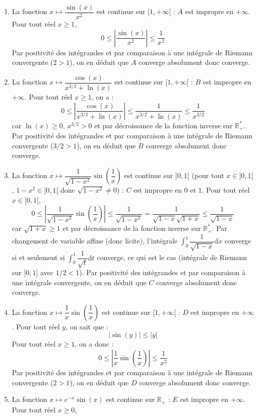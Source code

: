 \documentclass[a4paper,twoside,french,10pt]{VcCours}
\newcommand{\dx}{\text{d}x}
\newcommand{\dt}{\text{d}t}
\begin{document}
\begin{enumerate}
\item La fonction $x \mapsto  \dfrac{\sin(x)}{x^2}$ est continue sur $[1, + \infty[$ : $A$ est impropre en $+ \infty$. Pour tout réel $x \geq 1$,
$$ 0 \leq \left\vert  \dfrac{\sin(x)}{x^2} \right\vert \leq \dfrac{1}{x^2}$$
Par positivité des intégrandes et par comparaison à une intégrale de Riemann convergente ($2>1$), on en déduit que $A$ converge absolument donc converge.
\item La fonction $x \mapsto  \dfrac{\cos(x)}{x^{3/2}+\ln(x)} $ est continue sur $[1, + \infty[$ : $B$ est impropre en $+ \infty$. Pour tout réel $x \geq 1$, on a :
$$ 0 \leq \left\vert \dfrac{\cos(x)}{x^{3/2}+\ln(x)} \right\vert \leq  \dfrac{1}{x^{3/2}+\ln(x)} \leq \dfrac{1}{x^{3/2}}$$
car $\ln(x) \geq 0$, $x^{3/2}>0$ et par décroissance de la fonction inverse sur $\mathbb{R}_+^{*}$. Par positivité des intégrandes et par comparaison à une intégrale de Riemann convergente ($3/2>1$), on en déduit que $B$ converge absolument donc converge.
\item La fonction $x \mapsto \dfrac{1}{\sqrt{1-x^2}} \sin \left(\dfrac{1}{x}\right) $ est continue sur $]0,1[$ (pour tout $x \in ]0,1[$, $1-x^2 \in ]0,1[$ donc $\sqrt{1-x^2} \neq 0$) : $C$ est impropre en $0$ et $1$. Pour tout réel $x \in ]0,1[$,
$$ 0 \leq \left\vert  \dfrac{1}{\sqrt{1-x^2}} \sin \left(\dfrac{1}{x}\right) \right\vert \leq \dfrac{1}{\sqrt{1-x^2}} = \dfrac{1}{\sqrt{1-x}\sqrt{1+x}} \leq \dfrac{1}{\sqrt{1-x}}$$
car $\sqrt{1+x} \geq 1$ et par décroissance de la fonction inverse sur $\mathbb{R}_+^*$. Par changement de variable affine (donc licite), l'intégrale $\int_0^1 \dfrac{1}{\sqrt{1-x}} \dx$ converge si et seulement si $\int_0^1 \dfrac{1}{\sqrt{t}} \dt$ converge, ce qui est le cas (intégrale de Riemann sur $]0,1]$ avec $1/2<1$). Par positivité des intégrandes et par comparaison à une intégrale convergente, on en déduit que $C$ converge absolument donc converge.
\item La fonction $x \mapsto \dfrac{1}{x} \sin \left(\dfrac{1}{x}\right)$ est continue sur $[1, + \infty[$ : $D$ est impropre en $+ \infty$. Pour tout réel $y$, on sait que :
$$ \vert \sin(y) \vert \leq \vert y \vert$$
Pour tout réel $x \geq 1$, on a donc :
$$ 0 \leq \left\vert \dfrac{1}{x} \sin \left(\dfrac{1}{x}\right) \right\vert \leq \dfrac{1}{x^2}$$
Par positivité des intégrandes et par comparaison à une intégrale de Riemann convergente ($2>1$), on en déduit que $D$ converge absolument donc converge.
\item La fonction $x \mapsto e^{-x} \sin(x)$ est continue sur $\mathbb{R}_+$ : $E$ est impropre en $+ \infty$. Pour tout réel $x \geq 0$,

\end{enumerate}
\end{document}

